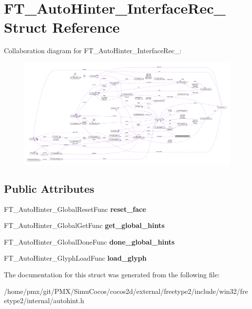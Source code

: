 \hypertarget{structFT__AutoHinter__InterfaceRec__}{}\section{F\+T\+\_\+\+Auto\+Hinter\+\_\+\+Interface\+Rec\+\_\+ Struct Reference}
\label{structFT__AutoHinter__InterfaceRec__}


Collaboration diagram for F\+T\+\_\+\+Auto\+Hinter\+\_\+\+Interface\+Rec\+\_\+\+:
\nopagebreak
\begin{figure}[H]
\begin{center}
\leavevmode
\includegraphics[width=350pt]{structFT__AutoHinter__InterfaceRec____coll__graph}
\end{center}
\end{figure}
\subsection*{Public Attributes}
\begin{DoxyCompactItemize}
\item 
\mbox{\label{structFT__AutoHinter__InterfaceRec___ac49b1bea5a33eb6475a16d8297c8dc56}} 
F\+T\+\_\+\+Auto\+Hinter\+\_\+\+Global\+Reset\+Func {\bfseries reset\+\_\+face}
\item 
\mbox{\label{structFT__AutoHinter__InterfaceRec___aa406ff1153cf6cc4a31d3b6ece46311c}} 
F\+T\+\_\+\+Auto\+Hinter\+\_\+\+Global\+Get\+Func {\bfseries get\+\_\+global\+\_\+hints}
\item 
\mbox{\label{structFT__AutoHinter__InterfaceRec___a1dd9c798f14a5eb0f56d101c448a24b7}} 
F\+T\+\_\+\+Auto\+Hinter\+\_\+\+Global\+Done\+Func {\bfseries done\+\_\+global\+\_\+hints}
\item 
\mbox{\label{structFT__AutoHinter__InterfaceRec___a9a71f9a4163791de748426b0075bc402}} 
F\+T\+\_\+\+Auto\+Hinter\+\_\+\+Glyph\+Load\+Func {\bfseries load\+\_\+glyph}
\end{DoxyCompactItemize}


The documentation for this struct was generated from the following file\+:\begin{DoxyCompactItemize}
\item 
/home/pmx/git/\+P\+M\+X/\+Simu\+Cocos/cocos2d/external/freetype2/include/win32/freetype2/internal/autohint.\+h\end{DoxyCompactItemize}
